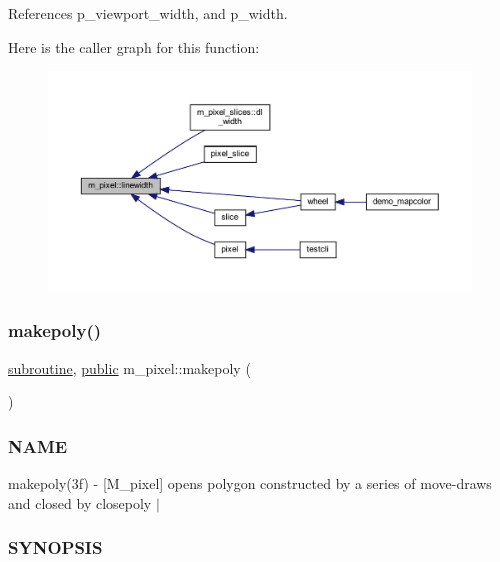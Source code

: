 References p\+\_\+viewport\+\_\+width, and p\+\_\+width.

Here is the caller graph for this function\+:
\nopagebreak
\begin{figure}[H]
\begin{center}
\leavevmode
\includegraphics[width=350pt]{namespacem__pixel_a16379e283aaa99e2e0ba1eb26e93452d_icgraph}
\end{center}
\end{figure}
\mbox{\label{namespacem__pixel_ab7128437f95b40004bf73fc6e3f597f8}} 
\subsubsection{\texorpdfstring{makepoly()}{makepoly()}}
{\footnotesize\ttfamily \hyperlink{M__stopwatch_83_8txt_acfbcff50169d691ff02d4a123ed70482}{subroutine}, \hyperlink{M__stopwatch_83_8txt_a2f74811300c361e53b430611a7d1769f}{public} m\+\_\+pixel\+::makepoly (\begin{DoxyParamCaption}{ }\end{DoxyParamCaption})}



\subsubsection*{N\+A\+ME}

makepoly(3f) -\/ \mbox{[}M\+\_\+pixel\mbox{]} opens polygon constructed by a series of move-\/draws and closed by closepoly $\vert$ 

\subsubsection*{S\+Y\+N\+O\+P\+S\+IS}

